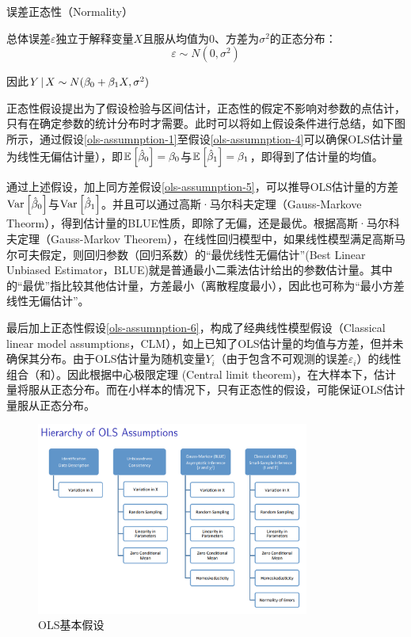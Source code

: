 \documentclass[11pt]{article}
\begin{document}
\begin{assumption}
    误差正态性（Normality）

    总体误差$\varepsilon$独立于解释变量$X$且服从均值为0、方差为$\sigma^2$的正态分布：
    \begin{equation*}
        \varepsilon \sim N(0,\sigma^2)
    \end{equation*}

    因此$Y \,\vert\, X \sim N(\beta_0+\beta_1 X, \sigma^2)$
    \label{ols-assumnption-6}
\end{assumption}

正态性假设提出为了假设检验与区间估计，正态性的假定不影响对参数的点估计，只有在确定参数的统计分布时才需要。此时可以将如上假设条件进行总结，如下图所示，通过假设\ref{ols-assumnption-1}至假设\ref{ols-assumnption-4}可以确保OLS估计量为线性无偏估计量），即$\mathbb{E}\left[\hat{\beta}_0\right]=\beta_0$与$\mathbb{E}\left[\hat{\beta}_1\right]=\beta_1$，即得到了估计量的均值。

通过上述假设，加上同方差假设\ref{ols-assumnption-5}，可以推导OLS估计量的方差$\operatorname{Var}\left[\hat{\beta}_0\right]$与$\operatorname{Var}\left[\hat{\beta}_1\right]$。并且可以通过高斯·马尔科夫定理（Gauss-Markove Theorm），得到估计量的BLUE性质，即除了无偏，还是最优。根据高斯·马尔科夫定理（Gauss-Markov Theorem），在线性回归模型中，如果线性模型满足高斯马尔可夫假定，则回归参数（回归系数）的“最优线性无偏估计”(Best Linear Unbiased Estimator，BLUE)就是普通最小二乘法估计给出的参数估计量。其中的“最优”指比较其他估计量，方差最小（离散程度最小），因此也可称为“最小方差线性无偏估计”。

最后加上正态性假设\ref{ols-assumnption-6}，构成了经典线性模型假设（Classical linear model assumptions，CLM），如上已知了OLS估计量的均值与方差，但并未确保其分布。由于OLS估计量为随机变量$Y_i$（由于包含不可观测的误差$\varepsilon_i$）的线性组合（和）。因此根据中心极限定理 (Central limit theorem)，在大样本下，估计量将服从正态分布。而在小样本的情况下，只有正态性的假设，可能保证OLS估计量服从正态分布。

\begin{figure}[H]
    \centering
    \includegraphics[width=0.8\textwidth]{fig/ols-assumptions.png}
    \caption{OLS基本假设}
    \label{fig:ols-assumptions}
\end{figure}
\end{document}
